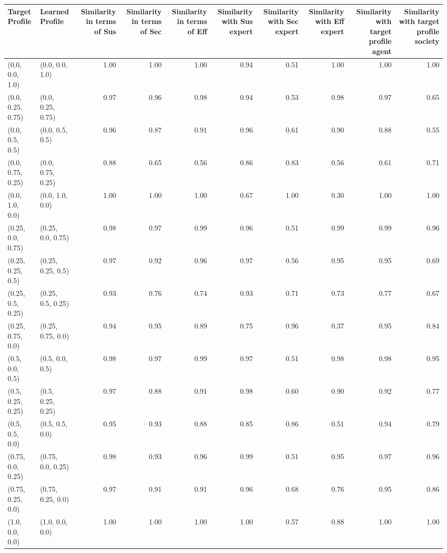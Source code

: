 \begin{tabular}{llrrrrrrrr}
\toprule
Target Profile & Learned Profile & Similarity in terms of Sus & Similarity in terms of Sec & Similarity in terms of Eff & Similarity with Sus expert & Similarity with Sec expert & Similarity with Eff expert & Similarity with target profile agent & Similarity with target profile society \\
\midrule
(0.0, 0.0, 1.0) & (0.0, 0.0, 1.0) & 1.00 & 1.00 & 1.00 & 0.94 & 0.51 & 1.00 & 1.00 & 1.00 \\
(0.0, 0.25, 0.75) & (0.0, 0.25, 0.75) & 0.97 & 0.96 & 0.98 & 0.94 & 0.53 & 0.98 & 0.97 & 0.65 \\
(0.0, 0.5, 0.5) & (0.0, 0.5, 0.5) & 0.96 & 0.87 & 0.91 & 0.96 & 0.61 & 0.90 & 0.88 & 0.55 \\
(0.0, 0.75, 0.25) & (0.0, 0.75, 0.25) & 0.88 & 0.65 & 0.56 & 0.86 & 0.83 & 0.56 & 0.61 & 0.71 \\
(0.0, 1.0, 0.0) & (0.0, 1.0, 0.0) & 1.00 & 1.00 & 1.00 & 0.67 & 1.00 & 0.30 & 1.00 & 1.00 \\
(0.25, 0.0, 0.75) & (0.25, 0.0, 0.75) & 0.98 & 0.97 & 0.99 & 0.96 & 0.51 & 0.99 & 0.99 & 0.96 \\
(0.25, 0.25, 0.5) & (0.25, 0.25, 0.5) & 0.97 & 0.92 & 0.96 & 0.97 & 0.56 & 0.95 & 0.95 & 0.69 \\
(0.25, 0.5, 0.25) & (0.25, 0.5, 0.25) & 0.93 & 0.76 & 0.74 & 0.93 & 0.71 & 0.73 & 0.77 & 0.67 \\
(0.25, 0.75, 0.0) & (0.25, 0.75, 0.0) & 0.94 & 0.95 & 0.89 & 0.75 & 0.96 & 0.37 & 0.95 & 0.84 \\
(0.5, 0.0, 0.5) & (0.5, 0.0, 0.5) & 0.98 & 0.97 & 0.99 & 0.97 & 0.51 & 0.98 & 0.98 & 0.95 \\
(0.5, 0.25, 0.25) & (0.5, 0.25, 0.25) & 0.97 & 0.88 & 0.91 & 0.98 & 0.60 & 0.90 & 0.92 & 0.77 \\
(0.5, 0.5, 0.0) & (0.5, 0.5, 0.0) & 0.95 & 0.93 & 0.88 & 0.85 & 0.86 & 0.51 & 0.94 & 0.79 \\
(0.75, 0.0, 0.25) & (0.75, 0.0, 0.25) & 0.98 & 0.93 & 0.96 & 0.99 & 0.51 & 0.95 & 0.97 & 0.96 \\
(0.75, 0.25, 0.0) & (0.75, 0.25, 0.0) & 0.97 & 0.91 & 0.91 & 0.96 & 0.68 & 0.76 & 0.95 & 0.86 \\
(1.0, 0.0, 0.0) & (1.0, 0.0, 0.0) & 1.00 & 1.00 & 1.00 & 1.00 & 0.57 & 0.88 & 1.00 & 1.00 \\
\bottomrule
\end{tabular}

